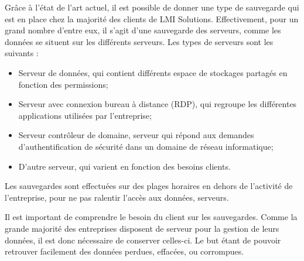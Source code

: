 \documentclass[pfe]{tnreport} %
\begin{document}
Grâce à l'état de l'art actuel, il est possible de donner une type de sauvegarde qui est en place chez la majorité des clients de LMI Solutions. Effectivement, pour un grand nombre d'entre eux, il s'agit d'une sauvegarde des serveurs, comme les données se situent sur les différents serveurs. Les types de serveurs sont les suivants : \newline
\begin{itemize}
 \item Serveur de données, qui contient différents espace de stockages partagés en fonction des permissions;
 \item Serveur avec connexion bureau à distance (RDP), qui regroupe les différentes applications utilisées par l'entreprise;
 \item Serveur contrôleur de domaine, serveur qui répond aux demandes d'authentification de sécurité dans un domaine de réseau informatique;
 \item D'autre serveur, qui varient en fonction des besoins clients. \newline
\end{itemize}

Les sauvegardes sont effectuées sur des plages horaires en dehors de l'activité de l'entreprise, pour ne pas ralentir l'accès aux données, serveurs.

Il est important de comprendre le besoin du client sur les sauvegardes.
Comme la grande majorité des entreprises disposent de serveur pour la gestion de leurs données, il est donc nécessaire de conserver celles-ci. Le but étant de pouvoir retrouver facilement des données perdues, effacées, ou corrompues. 
\end{document}

